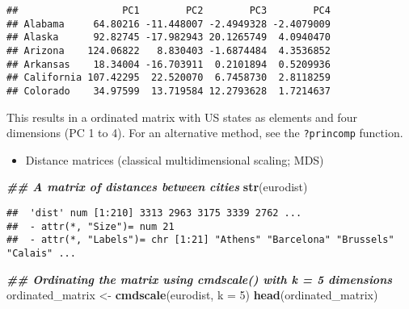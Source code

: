 \documentclass[
]{book}
\newenvironment{Shaded}{\begin{snugshade}}{\end{snugshade}}
\newcommand{\AttributeTok}[1]{\textcolor[rgb]{0.13,0.29,0.53}{#1}}
\newcommand{\DecValTok}[1]{\textcolor[rgb]{0.00,0.00,0.81}{#1}}
\newcommand{\DocumentationTok}[1]{\textcolor[rgb]{0.56,0.35,0.01}{\textbf{\textit{#1}}}}
\newcommand{\FunctionTok}[1]{\textcolor[rgb]{0.13,0.29,0.53}{\textbf{#1}}}
\newcommand{\NormalTok}[1]{#1}
\newcommand{\OtherTok}[1]{\textcolor[rgb]{0.56,0.35,0.01}{#1}}
\newcommand{\SpecialCharTok}[1]{\textcolor[rgb]{0.81,0.36,0.00}{\textbf{#1}}}
\providecommand{\tightlist}{%
  \setlength{\itemsep}{0pt}\setlength{\parskip}{0pt}}
\begin{document}
\begin{Shaded}
\end{Shaded}

\begin{verbatim}
##                  PC1        PC2        PC3        PC4
## Alabama     64.80216 -11.448007 -2.4949328 -2.4079009
## Alaska      92.82745 -17.982943 20.1265749  4.0940470
## Arizona    124.06822   8.830403 -1.6874484  4.3536852
## Arkansas    18.34004 -16.703911  0.2101894  0.5209936
## California 107.42295  22.520070  6.7458730  2.8118259
## Colorado    34.97599  13.719584 12.2793628  1.7214637
\end{verbatim}

This results in a ordinated matrix with US states as elements and four dimensions (PC 1 to 4). For an alternative method, see the \texttt{?princomp} function.

\begin{itemize}
\tightlist
\item
  Distance matrices (classical multidimensional scaling; MDS)
\end{itemize}

\begin{Shaded}
\begin{Highlighting}[]
\DocumentationTok{\#\# A matrix of distances between cities}
\FunctionTok{str}\NormalTok{(eurodist)}
\end{Highlighting}
\end{Shaded}

\begin{verbatim}
##  'dist' num [1:210] 3313 2963 3175 3339 2762 ...
##  - attr(*, "Size")= num 21
##  - attr(*, "Labels")= chr [1:21] "Athens" "Barcelona" "Brussels" "Calais" ...
\end{verbatim}

\begin{Shaded}
\begin{Highlighting}[]
\DocumentationTok{\#\# Ordinating the matrix using cmdscale() with k = 5 dimensions }
\NormalTok{ordinated\_matrix }\OtherTok{\textless{}{-}} \FunctionTok{cmdscale}\NormalTok{(eurodist, }\AttributeTok{k =} \DecValTok{5}\NormalTok{)}
\FunctionTok{head}\NormalTok{(ordinated\_matrix)}
\end{Highlighting}
\end{Shaded}
\end{document}
